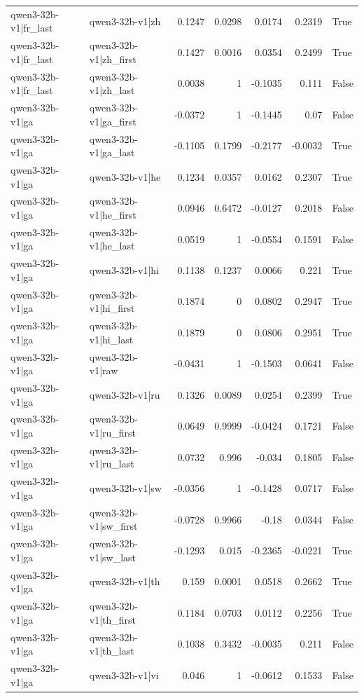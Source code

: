\begin{table}
\begin{tabular}{l l r r r r l}
qwen3-32b-v1|fr_last & qwen3-32b-v1|zh & 0.1247 & 0.0298 & 0.0174 & 0.2319 & True \\
qwen3-32b-v1|fr_last & qwen3-32b-v1|zh_first & 0.1427 & 0.0016 & 0.0354 & 0.2499 & True \\
qwen3-32b-v1|fr_last & qwen3-32b-v1|zh_last & 0.0038 & 1 & -0.1035 & 0.111 & False \\
qwen3-32b-v1|ga & qwen3-32b-v1|ga_first & -0.0372 & 1 & -0.1445 & 0.07 & False \\
qwen3-32b-v1|ga & qwen3-32b-v1|ga_last & -0.1105 & 0.1799 & -0.2177 & -0.0032 & True \\
qwen3-32b-v1|ga & qwen3-32b-v1|he & 0.1234 & 0.0357 & 0.0162 & 0.2307 & True \\
qwen3-32b-v1|ga & qwen3-32b-v1|he_first & 0.0946 & 0.6472 & -0.0127 & 0.2018 & False \\
qwen3-32b-v1|ga & qwen3-32b-v1|he_last & 0.0519 & 1 & -0.0554 & 0.1591 & False \\
qwen3-32b-v1|ga & qwen3-32b-v1|hi & 0.1138 & 0.1237 & 0.0066 & 0.221 & True \\
qwen3-32b-v1|ga & qwen3-32b-v1|hi_first & 0.1874 & 0 & 0.0802 & 0.2947 & True \\
qwen3-32b-v1|ga & qwen3-32b-v1|hi_last & 0.1879 & 0 & 0.0806 & 0.2951 & True \\
qwen3-32b-v1|ga & qwen3-32b-v1|raw & -0.0431 & 1 & -0.1503 & 0.0641 & False \\
qwen3-32b-v1|ga & qwen3-32b-v1|ru & 0.1326 & 0.0089 & 0.0254 & 0.2399 & True \\
qwen3-32b-v1|ga & qwen3-32b-v1|ru_first & 0.0649 & 0.9999 & -0.0424 & 0.1721 & False \\
qwen3-32b-v1|ga & qwen3-32b-v1|ru_last & 0.0732 & 0.996 & -0.034 & 0.1805 & False \\
qwen3-32b-v1|ga & qwen3-32b-v1|sw & -0.0356 & 1 & -0.1428 & 0.0717 & False \\
qwen3-32b-v1|ga & qwen3-32b-v1|sw_first & -0.0728 & 0.9966 & -0.18 & 0.0344 & False \\
qwen3-32b-v1|ga & qwen3-32b-v1|sw_last & -0.1293 & 0.015 & -0.2365 & -0.0221 & True \\
qwen3-32b-v1|ga & qwen3-32b-v1|th & 0.159 & 0.0001 & 0.0518 & 0.2662 & True \\
qwen3-32b-v1|ga & qwen3-32b-v1|th_first & 0.1184 & 0.0703 & 0.0112 & 0.2256 & True \\
qwen3-32b-v1|ga & qwen3-32b-v1|th_last & 0.1038 & 0.3432 & -0.0035 & 0.211 & False \\
qwen3-32b-v1|ga & qwen3-32b-v1|vi & 0.046 & 1 & -0.0612 & 0.1533 & False \\

\end{tabular}
\end{table}
